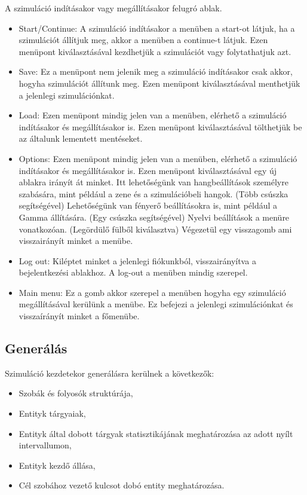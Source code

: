 
A szimuláció indításakor vagy megállításakor felugró ablak.

\begin{itemize}
    \item Start/Continue:
    A szimuláció indításakor a menüben a start-ot látjuk, ha a szimulációt állítjuk meg, akkor a menüben a continue-t látjuk.
    Ezen menüpont kiválasztásával kezdhetjük a szimulációt vagy folytathatjuk azt.
    \item Save:
    Ez a menüpont nem jelenik meg a szimuláció indításakor csak akkor, hogyha szimulációt állítunk meg.
    Ezen menüpont kiválasztásával menthetjük a jelenlegi szimulációnkat.
    \item Load:
    Ezen menüpont mindig jelen van a menüben, elérhető a szimuláció indításakor és megállításakor is.
    Ezen menüpont kiválasztásával tölthetjük be az általunk lementett mentéseket.
    \item Options:
    Ezen menüpont mindig jelen van a menüben, elérhető a szimuláció indításakor és megállításakor is.
    Ezen menüpont kiválasztásával egy új ablakra irányít át minket.
    Itt lehetőségünk van hangbeállítások személyre szabására, mint például a zene és a szimulációbeli hangok. (Több csúszka segítségével)
    Lehetőségünk van fényerő beállításokra is, mint például a Gamma állítására. (Egy csúszka segítségével)
    Nyelvi beállítások a menüre vonatkozóan. (Legördülő fülből kiválasztva)
    Végezetül egy visszagomb ami visszairányít minket a menübe.
    \item Log out:
    Kiléptet minket a jelenlegi fiókunkból, visszairányítva a bejelentkezési ablakhoz.
    A log-out a menüben mindig szerepel.
    \item Main menu:
    Ez a gomb akkor szerepel a menüben hogyha egy szimuláció megállításával kerülünk a menübe.
    Ez befejezi a jelenlegi szimulációnkat és visszaírányít minket a főmenübe.
\end{itemize}


\subsection{Generálás}

Szimuláció kezdetekor generálásra kerülnek a következők:

\begin{itemize}
    \item Szobák és folyosók struktúrája,
    \item Entityk tárgyaiak,
    \item Entityk által dobott tárgyak statisztikájának meghatározása az adott nyílt intervallumon,
    \item Entityk kezdő állása,
    \item Cél szobához vezető kulcsot dobó entity meghatározása.
\end{itemize}

